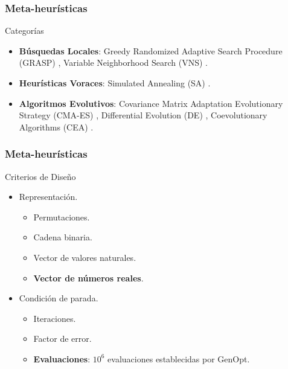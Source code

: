 \begin{frame}
\frametitle{Meta-heurísticas}
\begin{block}{Categorías}
\begin{itemize}
    \item \textbf{Búsquedas Locales}: Greedy Randomized Adaptive Search Procedure (GRASP) \citep{GRASP}, Variable Neighborhood Search (VNS) \citep{vns}.
    \item \textbf{Heurísticas Voraces}: Simulated Annealing (SA) \citep{SA}.
    \item \textbf{Algoritmos Evolutivos}: Covariance Matrix Adaptation Evolutionary Strategy (CMA-ES) \citep{CMA}, Differential Evolution (DE) \citep{DE1, DE2, DE3}, Coevolutionary Algorithms (CEA) \citep{COE1, COE2, COE3}.
\end{itemize}
\end{block}
\end{frame}

\begin{frame}
\frametitle{Meta-heurísticas}
\begin{block}{Criterios de Diseño}
\Fontvi
\begin{itemize}
	\item Representación.
    \begin{itemize}
    \item Permutaciones.
    \item Cadena binaria.
    \item Vector de valores naturales.
    \item \textbf{Vector de números reales}.
\end{itemize}
	\item Condición de parada.
    \begin{itemize}
    \item Iteraciones.
    \item Factor de error.
    \item \textbf{Evaluaciones}: $10^{6}$ evaluaciones establecidas por GenOpt.
\end{itemize}
	\end{itemize}
    \end{block}
\end{frame}

